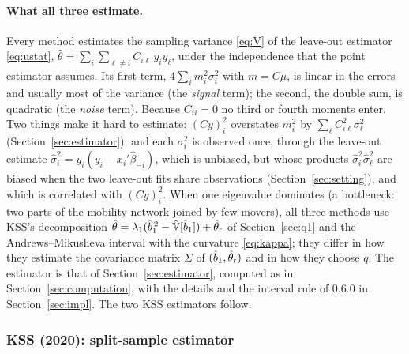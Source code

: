 \paragraph{What all three estimate.} Every method estimates the sampling variance \eqref{eq:V} of the leave-out
estimator \eqref{eq:ustat}, $\hat\theta=\sum_i\sum_{\ell\ne i}C_{i\ell}\,y_iy_\ell$, under the independence that the
point estimator assumes. Its first term, $4\sum_im_i^2\sigma_i^2$ with $m=C\mu$, is linear in the errors and usually
most of the variance (the \emph{signal} term); the second, the double sum, is quadratic (the \emph{noise} term).
Because $C_{ii}=0$ no third or fourth moments enter. Two things make it hard to estimate:
$(Cy)_i^2$ overstates $m_i^2$ by $\sum_\ell C_{i\ell}^2\sigma_\ell^2$ (Section~\ref{sec:estimator}); and each
$\sigma_i^2$ is observed once, through the leave-out estimate $\hat\sigma_i^2=y_i(y_i-x_i'\hat\beta_{-i})$, which is
unbiased, but whose products $\hat\sigma_i^2\hat\sigma_\ell^2$ are biased when the two leave-out fits share
observations (Section~\ref{sec:setting}), and which is correlated with $(Cy)_i^2$. When one eigenvalue dominates (a bottleneck: two parts of the
mobility network joined by few movers), all three methods use KSS's decomposition
$\hat\theta=\lambda_1(\hat b_1^{\,2}-\hat{\mathbb{V}}[\hat b_1])+\hat\theta_{\rm r}$ of Section~\ref{sec:q1} and the
Andrews--Mikusheva interval with the curvature \eqref{eq:kappa}; they differ in how they estimate the covariance
matrix $\Sigma$ of $(\hat b_1,\hat\theta_{\rm r})$ and in how they choose $q$. The \fevc{} estimator is that of
Section~\ref{sec:estimator}, computed as in Section~\ref{sec:computation}, with the details and the interval rule
of 0.6.0 in Section~\ref{sec:impl}. The two KSS estimators follow.

\subsubsection{KSS (2020): split-sample estimator}\label{kss:sec:kss}

